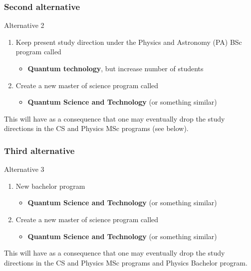 \documentclass{beamer}
\begin{document}
\begin{frame}
\frametitle{Second alternative}

\begin{block}{Alternative 2 }
\begin{enumerate}
\item Keep present study direction under the Physics and Astronomy (PA) BSc program called
\begin{itemize}

  \item \textbf{Quantum technology}, but increase number of students

\end{itemize}

\noindent
\item Create a new master of science program called
\begin{itemize}

  \item \textbf{Quantum Science and Technology} (or something similar)
\end{itemize}

\noindent
\end{enumerate}

\noindent
This will have as a consequence that one may eventually drop the study directions in the CS and Physics MSc programs (see below).
\end{block}
\end{frame}

\begin{frame}
\frametitle{Third  alternative}

\begin{block}{Alternative 3 }
\begin{enumerate}
\item New bachelor program 
\begin{itemize}

  \item \textbf{Quantum Science and Technology} (or something similar)

\end{itemize}

\noindent
\item Create a new master of science program called
\begin{itemize}

  \item \textbf{Quantum Science and Technology} (or something similar)
\end{itemize}

\noindent
\end{enumerate}

\noindent
This will have as a consequence that one may eventually drop the study directions in the CS and Physics MSc programs and Physics Bachelor program.
\end{block}
\end{frame}
\end{document}
